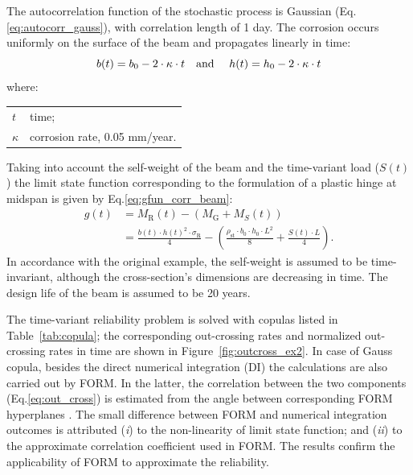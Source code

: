The autocorrelation function of the stochastic process is Gaussian (Eq.\ref{eq:autocorr_gauss}), with correlation length of 1 day. The corrosion occurs uniformly on the surface of the beam and propagates linearly in time:
\begin{equation}
	b(t) = {b_0} - 2 \cdot \kappa  \cdot t \text{\quad and \quad} h(t) = {h_0} - 2 \cdot \kappa  \cdot t 
\end{equation}
where:

\begin{tabular}{ll}
	$t$ & time; \\
	$\kappa$ & corrosion rate, 0.05 mm/year.
\end{tabular} \medskip

\noindent
Taking into account the self-weight of the beam and the time-variant load ($S(t)$) the limit state function corresponding to the formulation of a plastic hinge at midspan is given by Eq.\ref{eq:gfun_corr_beam}:
\begin{equation}
\label{eq:gfun_corr_beam}
	\begin{aligned}
		g(t) &= {M_{\mathrm{R}}}(t) - \left( {{M_{\mathrm{G}}} + {M_S}(t)} \right)\\
		& = \frac{{b(t) \cdot h{{(t)}^2} \cdot {\sigma _{\mathrm{R}}}}}{4} - \left( {\frac{{{\rho _{{\mathrm{st}}}} \cdot {b_0} \cdot {h_0} \cdot {L^2}}}{8} + \frac{{S(t) \cdot L}}{4}} \right).
	\end{aligned}
\end{equation}
In accordance with the original example, the self-weight is assumed to be time-invariant, although the cross-section's dimensions are decreasing in time. The design life of the beam is assumed to be 20 years.

The time-variant reliability problem is solved with copulas listed in Table~\ref{tab:copula}; the corresponding out-crossing rates and normalized out-crossing rates in time are shown in Figure~\ref{fig:outcross_ex2}. In case of Gauss copula, besides the direct numerical integration (DI) the calculations are also carried out by FORM. In the latter, the correlation between the two components (Eq.\ref{eq:out_cross}) is estimated from the angle between corresponding FORM hyperplanes \citep{Ditlevsen1979bounds}. The small difference between FORM and numerical integration outcomes is attributed (\textit{i}) to the non-linearity of limit state function; and (\textit{ii}) to the approximate correlation coefficient used in FORM. The results confirm the applicability of FORM to approximate the reliability.

